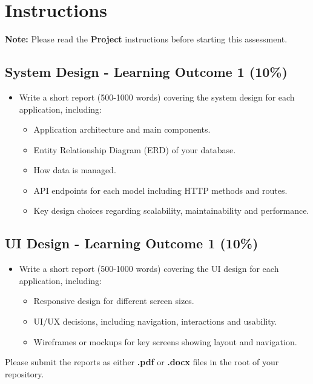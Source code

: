 \documentclass{article}
\begin{document}
\newpage

\section*{Instructions}

\textbf{Note:} Please read the \textbf{Project} instructions before starting this assessment. 

\subsection*{System Design - Learning Outcome 1 (10\%)}
\begin{itemize}
  \item Write a short report (500-1000 words) covering the system design for each application, including:
  \begin{itemize}
    \item Application architecture and main components.
    \item Entity Relationship Diagram (ERD) of your database.
    \item How data is managed.
    \item API endpoints for each model including HTTP methods and routes.
    \item Key design choices regarding scalability, maintainability and performance.
  \end{itemize}
\end{itemize}

\subsection*{UI Design - Learning Outcome 1 (10\%)}
\begin{itemize}
  \item Write a short report (500-1000 words) covering the UI design for each application, including:
  \begin{itemize}
    \item Responsive design for different screen sizes.
    \item UI/UX decisions, including navigation, interactions and usability.
    \item Wireframes or mockups for key screens showing layout and navigation.
  \end{itemize}
\end{itemize}

Please submit the reports as either \textbf{.pdf} or \textbf{.docx} files in the root of your repository.
\end{document}
